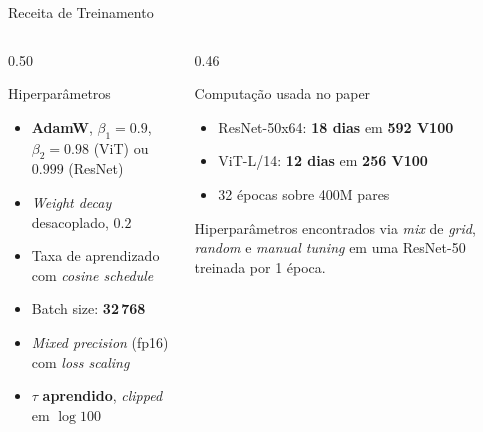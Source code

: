 \documentclass[aspectratio=169,xcolor=dvipsnames]{beamer}
\begin{document}
  \begin{frame}{Receita de Treinamento}
    \begin{columns}[T]
      \begin{column}{0.50\textwidth}
        \begin{block}{Hiperparâmetros}
          \begin{itemize}
            \item \textbf{AdamW}, $\beta_1{=}0.9$, $\beta_2{=}0.98$ (ViT) ou $0.999$ (ResNet)
            \item \textit{Weight decay} desacoplado, $0.2$
            \item Taxa de aprendizado com \textit{cosine schedule}
            \item Batch size: \textbf{32\,768}
            \item \textit{Mixed precision} (fp16) com \textit{loss scaling}
            \item $\tau$ \textbf{aprendido}, \textit{clipped} em $\log 100$
          \end{itemize}
        \end{block}
      \end{column}
      \begin{column}{0.46\textwidth}
        \begin{alertblock}{Computação usada no paper}
          \begin{itemize}
            \item ResNet-50x64: \textbf{18 dias} em \textbf{592 V100}
            \item ViT-L/14: \textbf{12 dias} em \textbf{256 V100}
            \item 32 épocas sobre 400M pares
          \end{itemize}
          Hiperparâmetros encontrados via \textit{mix} de
          \textit{grid}, \textit{random} e \textit{manual tuning} em
          uma ResNet-50 treinada por 1 época.
        \end{alertblock}
      \end{column}
    \end{columns}
  \end{frame}
\end{document}
